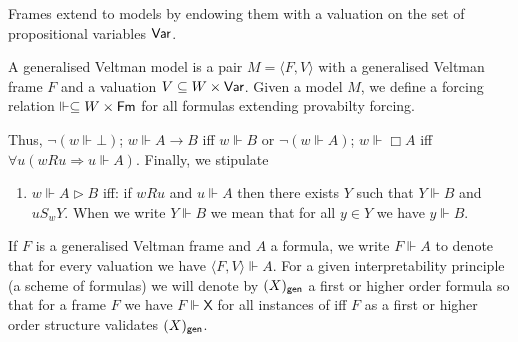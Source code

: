 \documentclass[twoside]{aiml20}
\newcommand{\principle}[1]{\text{$\mathsf{#1}$}}
\newcommand{\luka}[1]{\textcolor{blue}{\bf Luka: #1}}
\begin{document}
Frames extend to models by endowing them with a valuation on the set of propositional variables ${\sf Var}$.
\begin{definition}
\label{orgf390d7d}
A generalised Veltman model is a pair \(M=\langle F,V\rangle \) with a generalised Veltman frame \(F\) and a valuation \(V\subseteq W\times {\sf Var}\).
Given a model \(M\), we define a forcing relation \(\Vdash \subseteq W \times 
    {\sf Fm}\) for all formulas extending provabilty forcing.
  
    Thus, $\neg (w\Vdash \bot)$;
    $w\Vdash A\to B$ iff $w\Vdash B$ or $\neg (w\Vdash A)$;  $w\Vdash \Box A$ iff $\forall u (wRu \Rightarrow u\Vdash A)$. Finally, we stipulate
\begin{enumerate}[nosep]
\item[] \(w\Vdash A\rhd B\) iff: if \(wRu\) and \(u\Vdash A\) then there exists \(Y\) such
that \(Y\Vdash B\) and \(uS_wY\). When we write \(Y\Vdash B\) we mean that for all \(y\in Y\) we
have \(y\Vdash B\).
\end{enumerate}
\end{definition}
If \(F\) is a generalised Veltman frame and \(A\) a formula, we write \(F\Vdash A\) to
denote that for every valuation we have \(\langle F,V\rangle \Vdash A \). For a given interpretability principle (a scheme of formulas)
\principle{X} we will denote by $(X)_{\sf gen}$ a first or higher order formula
so that for a frame $F$ we have $F\Vdash \principle{X}$ for all instances of \principle{X} iff $F$ as a first or higher order structure validates $(X)_{\sf gen}$.
\end{document}
